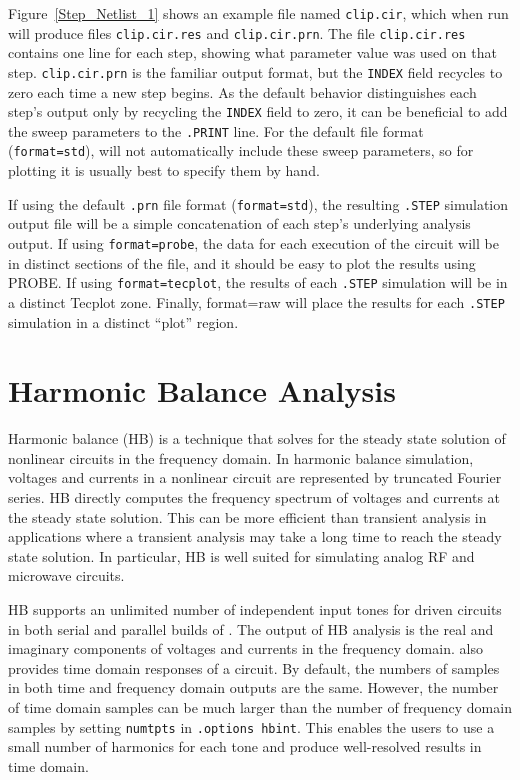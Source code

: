Figure~\ref{Step_Netlist_1} shows an example file named
\verb+clip.cir+, which when run will produce files \verb+clip.cir.res+
and \verb+clip.cir.prn+.  The file \verb+clip.cir.res+ contains one
line for each step, showing what parameter value was used on that
step.  \verb+clip.cir.prn+ is the familiar output format, but the
\verb+INDEX+ field recycles to zero each time a new step begins.  As
the default behavior distinguishes each step's output only by
recycling the \verb+INDEX+ field to zero, it can be beneficial to add
the sweep parameters to the \verb+.PRINT+ line.  For the default file
format (\texttt{format=std}), \Xyce{} will not automatically include
these sweep parameters, so for plotting it is usually best to specify
them by hand.

If using the default \texttt{.prn} file format (\texttt{format=std}),
the resulting \texttt{.STEP} simulation output file will be a simple
concatenation of each step's underlying analysis output.  If using
\texttt{format=probe}, the data for each execution of the circuit will
be in distinct sections of the file, and it should be easy to plot the
results using PROBE.  If using \texttt{format=tecplot}, the results of
each \texttt{.STEP} simulation will be in a distinct Tecplot
zone. Finally, format=raw will place the results for each
\texttt{.STEP} simulation in a distinct ``plot'' region.





\section{Harmonic Balance Analysis}
\label{HB_Analysis}
\label{HB_Overview}
 

Harmonic balance (HB) is a technique that solves for the steady state
solution of nonlinear circuits in the frequency domain. In harmonic
balance simulation, voltages and currents in a nonlinear circuit are
represented by truncated Fourier series. HB directly computes the
frequency spectrum of voltages and currents at the steady state
solution. This can be more efficient than transient analysis in
applications where a transient analysis may take a long time to reach
the steady state solution.  In particular, HB is well suited for
simulating analog RF and microwave circuits.

HB supports an unlimited number of independent input tones for driven
circuits in both serial and parallel builds of \Xyce{}. The output of
HB analysis is the real and imaginary components of voltages and
currents in the frequency domain. \Xyce{} also provides time domain
responses of a circuit. By default, the numbers of samples in both
time and frequency domain outputs are the same.  However, the number
of time domain samples can be much larger than the number of frequency
domain samples by setting \verb|numtpts| in
\verb|.options hbint|. This enables the users to use a small number of
harmonics for each tone and produce well-resolved results in time
domain.

